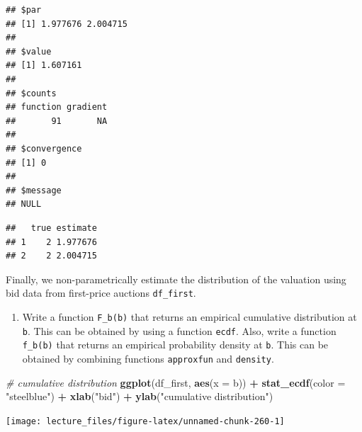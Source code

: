 \documentclass[]{book}
\newenvironment{Shaded}{\begin{snugshade}}{\end{snugshade}}
\newcommand{\KeywordTok}[1]{\textcolor[rgb]{0.13,0.29,0.53}{\textbf{#1}}}
\newcommand{\DataTypeTok}[1]{\textcolor[rgb]{0.13,0.29,0.53}{#1}}
\newcommand{\StringTok}[1]{\textcolor[rgb]{0.31,0.60,0.02}{#1}}
\newcommand{\CommentTok}[1]{\textcolor[rgb]{0.56,0.35,0.01}{\textit{#1}}}
\newcommand{\OperatorTok}[1]{\textcolor[rgb]{0.81,0.36,0.00}{\textbf{#1}}}
\newcommand{\NormalTok}[1]{#1}
\providecommand{\tightlist}{%
  \setlength{\itemsep}{0pt}\setlength{\parskip}{0pt}}
\begin{document}
\begin{verbatim}
## $par
## [1] 1.977676 2.004715
## 
## $value
## [1] 1.607161
## 
## $counts
## function gradient 
##       91       NA 
## 
## $convergence
## [1] 0
## 
## $message
## NULL
\end{verbatim}

\begin{Shaded}
\end{Shaded}

\begin{verbatim}
##   true estimate
## 1    2 1.977676
## 2    2 2.004715
\end{verbatim}

Finally, we non-parametrically estimate the distribution of the
valuation using bid data from first-price auctions \texttt{df\_first}.

\begin{enumerate}
\def\labelenumi{\arabic{enumi}.}
\setcounter{enumi}{9}
\tightlist
\item
  Write a function \texttt{F\_b(b)} that returns an empirical cumulative
  distribution at \texttt{b}. This can be obtained by using a function
  \texttt{ecdf}. Also, write a function \texttt{f\_b(b)} that returns an
  empirical probability density at \texttt{b}. This can be obtained by
  combining functions \texttt{approxfun} and \texttt{density}.
\end{enumerate}

\begin{Shaded}
\begin{Highlighting}[]
\CommentTok{# cumulative distribution}
\KeywordTok{ggplot}\NormalTok{(df_first, }\KeywordTok{aes}\NormalTok{(}\DataTypeTok{x =}\NormalTok{ b)) }\OperatorTok{+}\StringTok{ }\KeywordTok{stat_ecdf}\NormalTok{(}\DataTypeTok{color =} \StringTok{"steelblue"}\NormalTok{) }\OperatorTok{+}
\StringTok{  }\KeywordTok{xlab}\NormalTok{(}\StringTok{"bid"}\NormalTok{) }\OperatorTok{+}\StringTok{ }\KeywordTok{ylab}\NormalTok{(}\StringTok{"cumulative distribution"}\NormalTok{)}
\end{Highlighting}
\end{Shaded}

\begin{center}\texttt{[image: lecture\_files/figure-latex/unnamed-chunk-260-1]} \end{center}
\end{document}

